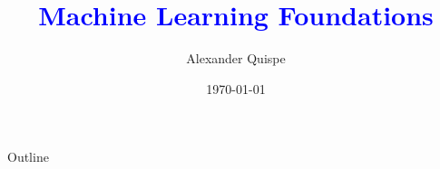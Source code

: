 \documentclass[11pt,aspectratio=169]{beamer}
\title{\textcolor{blue}{Machine Learning Foundations}}
\author{Alexander Quispe}
\date{\today}
\begin{document}
\begin{frame}
\maketitle
\end{frame}

\begin{frame}{Outline}
\tableofcontents
\end{frame}







\end{document}
